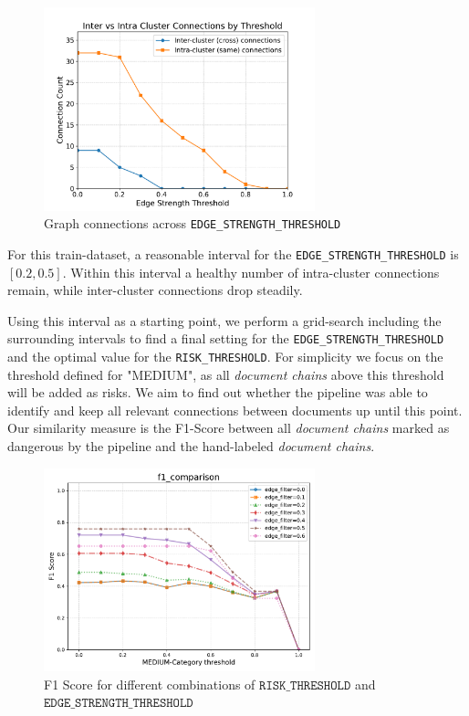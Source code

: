 \begin{figure}[h]
    \centering
    \includegraphics[width=0.7\textwidth]{figures/c2_cluster_connections_counts.pdf}
    \caption{Graph connections across \texttt{EDGE\_STRENGTH\_THRESHOLD}}
    \label{fig:strength_connection_counts}
\end{figure}  

For this train-dataset, a reasonable interval for the \texttt{EDGE\_STRENGTH\_THRESHOLD} is $[0.2,0.5]$. Within this interval a healthy number of intra-cluster connections remain, while inter-cluster connections drop steadily. 

Using this interval as a starting point, we perform a grid-search including the surrounding intervals to find a final setting for the \texttt{EDGE\_STRENGTH\_THRESHOLD} and the optimal value for the \texttt{RISK\_THRESHOLD}. For simplicity we focus on the threshold defined for "MEDIUM", as all \textit{document chains} above this threshold will be added as risks. We aim to find out whether the pipeline was able to identify and keep all relevant connections between documents up until this point. Our similarity measure is the F1-Score between all \textit{document chains} marked as dangerous by the pipeline and the hand-labeled \textit{document chains}. 

\begin{figure}[h]
    \centering
    \includegraphics[width=0.7\textwidth]{figures/c2_f1_comparison.pdf}
    \caption{F1 Score for different combinations of $\texttt{RISK\_THRESHOLD}$ and $\texttt{EDGE\_STRENGTH\_THRESHOLD}$}
    \label{fig:f1_chain_score}
\end{figure} 

